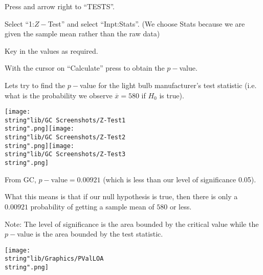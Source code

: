 \documentclass[11pt,a4paper]{book}
\begin{document}
\begin{steps}[leftmargin=1.5cm]

\item  Press \tcbox[box align=base,nobeforeafter,colback=black, colframe=black,size=small]{\textbf{\textcolor{white}{stat}}}
and arrow right to ``TESTS''.

\item  Select ``1:$Z-$Test'' and select ``Inpt:Stats''. (We
choose Stats because we are given the sample mean rather than the
raw data)

\item  Key in the values as required.

\item  With the cursor on ``Calculate'' press \tcbox[box align=base,nobeforeafter,colback=white, colframe=black,size=small]{\textbf{\textcolor{black}{enter}}}
to obtain the $p-$value.

\end{steps}

Lets try to find the $p-$value for the light bulb manufacturer's
test statistic (i.e. what is the probability we observe $\overline{x}=580$
if $H_{0}$ is true).
\begin{center}
\texttt{[image: \\string"lib/GC Screenshots/Z-Test1\\string".png]}\hspace{1cm}\texttt{[image: \\string"lib/GC Screenshots/Z-Test2\\string".png]}\hspace{1cm}\texttt{[image: \\string"lib/GC Screenshots/Z-Test3\\string".png]}
\par\end{center}

From GC, $p-\text{value}=0.00921$ (which is less than our level of
significance 0.05).

What this means is that if our null hypothesis is true, then there
is only a $0.00921$ probability of getting a sample mean of $580$
or less.

\medskip


\medskip

Note: The level of significance is the area bounded by the critical
value while the $p-$value is the area bounded by the test statistic.
\begin{center}
\texttt{[image: \\string"lib/Graphics/PValLOA\\string".png]}
\par\end{center}
\end{document}
